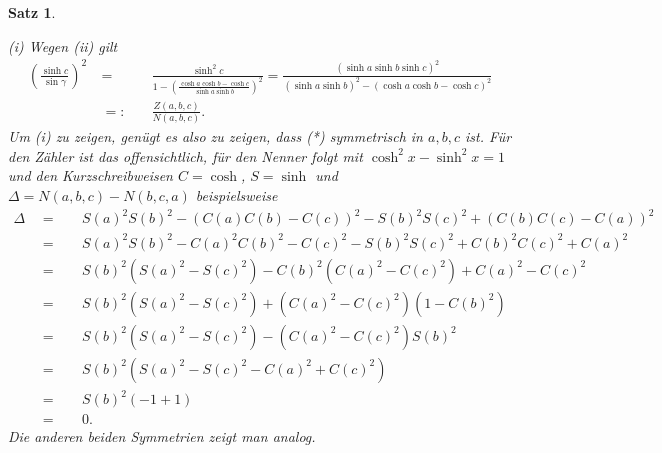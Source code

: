 \documentclass[11pt]{book}
\numberwithin{dummy}{section}
\newtheorem{theorem}{Satz}[section]
\theoremstyle{nonumberbreak}
\newenvironment{pr}[1][]{\ifthenelse{\equal{#1}{}}{\proof}{\proof[#1]}\rm}{\endproof}
\begin{document}
\begin{spacing}{1.4}
\begin{theorem}
\begin{pr}
\begin{compactenum}
\item[(i)] Wegen (ii) gilt 
\begin{alignat*}{5}
\left( \frac{ \sinh c}{\sin \gamma}\right)^2 \ &=&& \ \frac{ \sinh^2c}{1 - \left( \frac{\cosh a \cosh b - \cosh c}{\sinh a \sinh b} \right)^2} = \frac{ (\sinh a \sinh b \sinh c)^2}{(\sinh a \sinh b)^2 - (\cosh a \cosh b - \cosh c)^2}\\
& =:&& \ \frac{Z(a,b,c)}{N(a,b,c)}.
\end{alignat*}
Um (i) zu zeigen, genügt es also zu zeigen, dass (*) symmetrisch in $a,b,c$ ist. Für den Zähler ist das offensichtlich, für den Nenner folgt mit $\cosh^2x - \sinh^2x =1$ und den Kurzschreibweisen $C=\cosh$, $S=\sinh$ und $\Delta=N(a,b,c)-N(b,c,a)$ beispielsweise
\begin{alignat*}{5}
\Delta \ \ &=&& \ \ S(a)^2S(b)^2 - (C(a)C(b)-C(c))^2 - S(b)^2S(c)^2+(C(b)C(c)-C(a))^2 \\
&=&& \ \ S(a)^2S(b)^2-C(a)^2C(b)^2-C(c)^2-S(b)^2S(c)^2+C(b)^2C(c)^2+C(a)^2 \\
&=&& \ \ S(b)^2\left( S(a)^2-S(c)^2\right) - C(b)^2\left( C(a)^2-C(c)^2\right) + C(a)^2-C(c)^2 \\
&=&& \ \ S(b)^2\left( S(a)^2-S(c)^2\right) + \left( C(a)^2-C(c)^2\right)\left( 1-C(b)^2\right) \\
&=&& \ \ S(b)^2\left( S(a)^2-S(c)^2\right) - \left( C(a)^2-C(c)^2\right) S(b)^2\\
&=&& \ \ S(b)^2\left( S(a)^2-S(c)^2 - C(a)^2 + C(c)^2\right) \\
&=&& \ \ S(b)^2 (-1+1)\\
&=&& \ \ 0.
\end{alignat*}
Die anderen beiden Symmetrien zeigt man analog.


\end{compactenum}
\end{pr}
\end{theorem}
\end{spacing}
\end{document}
